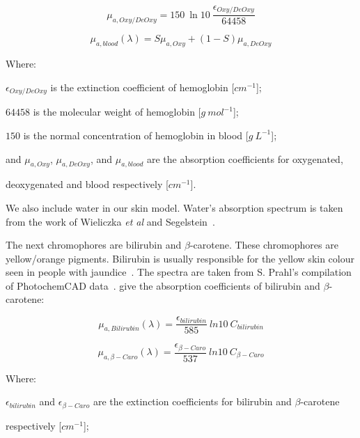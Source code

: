 \begin{equation}
\mu_{a,Oxy/DeOxy}=150\ \ln10\ \frac{\epsilon_{Oxy/DeOxy}}{64458}
\label{eqn:oxy}
\end{equation}

\begin{equation}
\mu_{a,blood}(\lambda) = S\mu_{a,Oxy}+(1-S)\mu_{a,DeOxy}
\label{eqn:blood}
\end{equation}

\noindent Where:

\indent $\epsilon_{Oxy/DeOxy}$ is the extinction coefficient of hemoglobin [$cm^{-1}$];

\indent $64458$ is the molecular weight of hemoglobin [$g\ mol^{-1}$];

\indent $150$ is the normal concentration of hemoglobin in blood [$g\ L^{-1}$];

\indent and $\mu_{a,Oxy}$, $\mu_{a,DeOxy}$, and $\mu_{a,blood}$ are the absorption coefficients for oxygenated, 

\indent deoxygenated and blood respectively [$cm^{-1}$].

\medskip

We also include water in our skin model.
Water's absorption spectrum is taken from the work of Wieliczka \textit{et al} and Segelstein~\cite{wieliczka1989wedge,segelstein1981complex}.

The next chromophores are bilirubin and $\beta$-carotene.
These chromophores are yellow/orange pigments. 
Bilirubin is usually responsible for the yellow skin colour seen in people with jaundice~\cite{jacques1997developing}.
The spectra are taken from S. Prahl's compilation of PhotochemCAD data~\cite{prahlcaro,prahlbili}.
 give the absorption coefficients of bilirubin and $\beta$-carotene:

\begin{equation}
\mu_{a,Bilirubin}(\lambda)=\frac{\epsilon_{bilirubin}}{585}\ ln10\ C_{bilirubin}
\label{eqn:bili}
\end{equation}

\begin{equation}
\mu_{a,\beta-Caro}(\lambda)=\frac{\epsilon_{\beta-Caro}}{537}\ ln10\ C_{\beta-Caro}
\label{eqn:caro}
\end{equation}

\noindent Where:

\indent $\epsilon_{bilirubin}$ and $\epsilon_{\beta-Caro}$ are the extinction coefficients for bilirubin and $\beta$-carotene 

\indent respectively [$cm^{-1}$];

